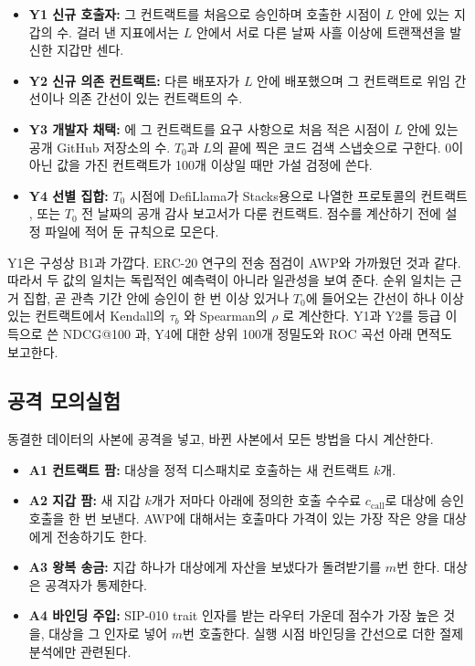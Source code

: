 \begin{itemize}
\item \textbf{Y1 신규 호출자:} 그 컨트랙트를 처음으로 승인하며 호출한 시점이 $L$ 안에 있는 지갑의 수. 걸러 낸 지표에서는 $L$ 안에서 서로 다른 날짜 사흘 이상에 트랜잭션을 발신한 지갑만 센다.
\item \textbf{Y2 신규 의존 컨트랙트:} 다른 배포자가 $L$ 안에 배포했으며 그 컨트랙트로 위임 간선이나 의존 간선이 있는 컨트랙트의 수.
\item \textbf{Y3 개발자 채택:} 에 그 컨트랙트를 요구 사항으로 처음 적은 시점이 $L$ 안에 있는 공개 GitHub 저장소의 수. $T_0$과 $L$의 끝에 찍은 코드 검색 스냅숏으로 구한다. 0이 아닌 값을 가진 컨트랙트가 100개 이상일 때만 가설 검정에 쓴다.
\item \textbf{Y4 선별 집합:} $T_0$ 시점에 DefiLlama가 Stacks용으로 나열한 프로토콜의 컨트랙트 \cite{defillama}, 또는 $T_0$ 전 날짜의 공개 감사 보고서가 다룬 컨트랙트. 점수를 계산하기 전에 설정 파일에 적어 둔 규칙으로 모은다.
\end{itemize}

Y1은 구성상 B1과 가깝다. ERC-20 연구의 전송 점검이 AWP와 가까웠던 것과 같다. 따라서 두 값의 일치는 독립적인 예측력이 아니라 일관성을 보여 준다. 순위 일치는 근거 집합, 곧 관측 기간 안에 승인이 한 번 이상 있거나 $T_0$에 들어오는 간선이 하나 이상 있는 컨트랙트에서 Kendall의 $\tau_b$ \cite{kendall1938}와 Spearman의 $\rho$ \cite{spearman1904}로 계산한다. Y1과 Y2를 등급 이득으로 쓴 NDCG@100 \cite{jarvelin2002ndcg}과, Y4에 대한 상위 100개 정밀도와 ROC 곡선 아래 면적도 보고한다.

\subsection{공격 모의실험}

동결한 데이터의 사본에 공격을 넣고, 바뀐 사본에서 모든 방법을 다시 계산한다.

\begin{itemize}
\item \textbf{A1 컨트랙트 팜:} 대상을 정적 디스패치로 호출하는 새 컨트랙트 $k$개.
\item \textbf{A2 지갑 팜:} 새 지갑 $k$개가 저마다 아래에 정의한 호출 수수료 $c_{\mathrm{call}}$로 대상에 승인 호출을 한 번 보낸다. AWP에 대해서는 호출마다 가격이 있는 가장 작은 양을 대상에게 전송하기도 한다.
\item \textbf{A3 왕복 송금:} 지갑 하나가 대상에게 자산을 보냈다가 돌려받기를 $m$번 한다. 대상은 공격자가 통제한다.
\item \textbf{A4 바인딩 주입:} SIP-010 trait 인자를 받는 라우터 가운데 점수가 가장 높은 것을, 대상을 그 인자로 넣어 $m$번 호출한다. 실행 시점 바인딩을 간선으로 더한 절제 분석에만 관련된다.
\end{itemize}

